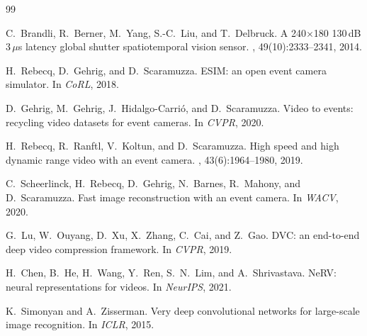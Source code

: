 \documentclass[10pt,twocolumn,letterpaper]{article}
\begin{document}
{\small


\begin{thebibliography}{99}

C.~Brandli, R.~Berner, M.~Yang, S.-C.~Liu, and T.~Delbruck.
\newblock A 240$\times$180 130\,dB 3\,$\mu$s latency global shutter spatiotemporal vision sensor.
, 49(10):2333--2341, 2014.

H.~Rebecq, D.~Gehrig, and D.~Scaramuzza.
\newblock ESIM: an open event camera simulator.
\newblock In {\em CoRL}, 2018.

D.~Gehrig, M.~Gehrig, J.~Hidalgo-Carri\'o, and D.~Scaramuzza.
\newblock Video to events: recycling video datasets for event cameras.
\newblock In {\em CVPR}, 2020.

H.~Rebecq, R.~Ranftl, V.~Koltun, and D.~Scaramuzza.
\newblock High speed and high dynamic range video with an event camera.
, 43(6):1964--1980, 2019.

C.~Scheerlinck, H.~Rebecq, D.~Gehrig, N.~Barnes, R.~Mahony, and D.~Scaramuzza.
\newblock Fast image reconstruction with an event camera.
\newblock In {\em WACV}, 2020.

G.~Lu, W.~Ouyang, D.~Xu, X.~Zhang, C.~Cai, and Z.~Gao.
\newblock DVC: an end-to-end deep video compression framework.
\newblock In {\em CVPR}, 2019.

H.~Chen, B.~He, H.~Wang, Y.~Ren, S.~N.~Lim, and A.~Shrivastava.
\newblock NeRV: neural representations for videos.
\newblock In {\em NeurIPS}, 2021.

K.~Simonyan and A.~Zisserman.
\newblock Very deep convolutional networks for large-scale image recognition.
\newblock In {\em ICLR}, 2015.

\end{thebibliography}
}
\end{document}
